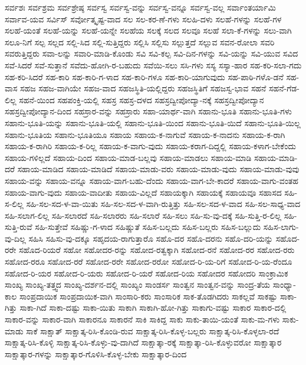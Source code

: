{ಸರ್ವಶಃ
ಸರ್ವಶ್ರಮ
ಸರ್ವಶ್ರೇಷ್ಠ
ಸರ್ವಸ್ವ
ಸರ್ವಸ್ವ-ವನ್ನು
ಸರ್ವಸ್ವ-ವನ್ನೂ
ಸರ್ವಸ್ವ-ವಲ್ಲ
ಸರ್ವಾಂತರ್ಯಾಮಿ
ಸರ್ವಾವ-ಯವ
ಸರ್ವಿಸ್
ಸರ್ವೋತ್ಕೃಷ್ಟ-ವಾದ
ಸಲ
ಸಲ-ಕರ-ಣೆ-ಗಳು
ಸಲಹಿ-ದಳು
ಸಲಹೆ-ಗಳನ್ನು
ಸಲಹೆ-ಗಳ
ಸಲಹೆ-ಯಂತೆ
ಸಲಹೆ-ಯನ್ನು
ಸಲಹೆ-ಯನ್ನೇ
ಸಲಹೆಯ
ಸಲಕ್ಕೆ
ಸಲದ
ಸಲವೂ
ಸಲಹೆ
ಸಲಾ-ಕೆ-ಗಳನ್ನು
ಸಲು-ವಾಗಿ
ಸಲೂ-ನಿಗೆ
ಸಲ್ಪ
ಸಲ್ಲದ
ಸಲ್ಲಿ-ಸಿದ
ಸಲ್ಲಿ-ಸುತ್ತಿದ್ದರು
ಸಲ್ಲಿಸಿ
ಸಲ್ಲಿಸು
ಸಲ್ಲುತ್ತದೆ
ಸಲ್ಲುವ
ಸವನ-ರೋಲಾ
ಸವರಿ
ಸವರುತ್ತಿದ್ದರು
ಸವಾ-ಲನ್ನು
ಸವಾರಿ-ಮಾಡಿ-ಕೊಂಡು
ಸವಿ
ಸವಿ-ಕಲ್ಪ
ಸವಿ-ದಿನ-ಗಳನ್ನು
ಸವಿ-ಯನ್ನು
ಸವಿ-ಯುವ
ಸವಿದ
ಸವೆ-ಸಿದರೆ
ಸವೆ-ಸುತ್ತಾನೆ
ಸವೆದು-ಹೋಗಿ-ರ-ಬಹುದು
ಸವೆಯಿ-ಸಲು
ಸಸಿ-ಗಳು
ಸಸ್ಯ
ಸಸ್ಯಾ-ಹಾರ
ಸಹ-ಕರಿ-ಸಲಾ-ಗದು
ಸಹ-ಕರಿ-ಸಿದರೆ
ಸಹ-ಕಾರಿ
ಸಹ-ಕಾರಿ-ಗ-ಳಾದ
ಸಹ-ಕಾರಿ-ಗಳೂ
ಸಹ-ಕಾರಿ-ಯಾಗುವುದು
ಸಹ-ಪಾಠಿ-ಗಳೊ-ಡನೆ
ಸಹ-ವಾಸ
ಸಹಜ
ಸಹಜ-ವಾಗಿಯೇ
ಸಹಜ-ವಾದ
ಸಹಜಸ್ಥಿತಿ-ಯಲ್ಲಿದ್ದರು
ಸಹಜಸ್ಥಿತಿಗೆ
ಸಹಜಸ್ವ-ಭಾವ
ಸಹನೆ
ಸಹನೆ-ಗೆಡ-ಲಿಲ್ಲ
ಸಹನೆ-ಯಿಂದ
ಸಹಪಂಕ್ತಿ-ಯಲ್ಲಿ
ಸಹಸ್ರ
ಸಹಸ್ರ-ದಳದ
ಸಹಸ್ರದ್ವೀಪೋದ್ಯಾ-ನಕ್ಕೆ
ಸಹಸ್ರದ್ವೀಪೋದ್ಯಾನ
ಸಹಸ್ರದ್ವೀಪೋದ್ಯಾನ-ದಿಂದ
ಸಹಸ್ರಾರ-ವನ್ನು
ಸಹಸ್ರಾರು
ಸಹಾ-ಯಾರ್ಥ-ವಾಗಿ
ಸಹಾನು-ಭೂತಿ
ಸಹಾನು-ಭೂತಿ-ಗಳು
ಸಹಾನು-ಭೂತಿ-ಯನ್ನು
ಸಹಾನು-ಭೂತಿ-ಯಲ್ಲಿ
ಸಹಾನು-ಭೂತಿ-ಯಿಂದ
ಸಹಾನು-ಭೂತಿ-ಯಿದೆ
ಸಹಾನು-ಭೂತಿ-ಯಿಲ್ಲ
ಸಹಾನು-ಭೂತಿಯ
ಸಹಾನು-ಭೂತಿಯೂ
ಸಹಾಯ
ಸಹಾಯ-ಕ-ನಾಗುವೆ
ಸಹಾಯ-ಕ-ನಾದನು
ಸಹಾಯ-ಕ-ರಾಗಿ
ಸಹಾಯ-ಕ-ರಾಗಿರಿ
ಸಹಾಯ-ಕ-ರಿಲ್ಲ
ಸಹಾಯ-ಕ-ವಾಗು-ವುದು
ಸಹಾಯ-ಕರಾಗ-ದಿದ್ದಲ್ಲಿ
ಸಹಾಯ-ಕಳಾಗ-ಬೇಕೆಂದು
ಸಹಾಯ-ಗಳಿಲ್ಲದೆ
ಸಹಾಯ-ದಿಂದ
ಸಹಾಯ-ಮಾಡ-ಬಲ್ಲವು
ಸಹಾಯ-ಮಾಡಲು
ಸಹಾಯ-ಮಾಡಿ
ಸಹಾಯ-ಮಾಡಿ-ದರೆ
ಸಹಾಯ-ಮಾಡಿದ
ಸಹಾಯ-ಮಾಡಿದೆ
ಸಹಾಯ-ಮಾಡು-ವರು
ಸಹಾಯ-ಮಾಡು-ವುದು
ಸಹಾಯ-ಮಾಡು-ವುವು
ಸಹಾಯ-ವನ್ನು
ಸಹಾಯ-ವನ್ನೂ
ಸಹಾಯ-ವಾಗ-ಬಹು-ದೆಂದು
ಸಹಾಯ-ವಾಗ-ಬೇ-ಕಾದರೆ
ಸಹಾಯ-ವಾಗು-ವಂತಹ
ಸಹಾಯ-ವಾಗು-ವುದು
ಸಹಾಯ-ವಾದೀತು
ಸಹಾಯ-ವಿಲ್ಲದೆ
ಸಹಾಯಕ್ಕಾಗಿ
ಸಹಾಯಕ್ಕೆ
ಸಹಾಯವೂ
ಸಹಾಸದ
ಸಹಿ-ಸ-ಲಿಲ್ಲ
ಸಹಿ-ಸಲ-ಸದ-ಳ-ವಾ-ಯಿತು
ಸಹಿ-ಸಲ-ಸದ-ಳ-ವಾಗಿ-ರುತ್ತಿತ್ತು
ಸಹಿ-ಸಲ-ಸದ-ಳ-ವಾದ
ಸಹಿ-ಸಲ-ಸಾಧ್ಯ-ವಾದ
ಸಹಿ-ಸಲಾಗ-ಲಿಲ್ಲ
ಸಹಿ-ಸಲಾರದೆ
ಸಹಿ-ಸಲಾರರು
ಸಹಿ-ಸಲಾರೆ
ಸಹಿ-ಸಲು
ಸಹಿ-ಸು-ವು-ದಕ್ಕೆ
ಸಹಿ-ಸುತ್ತಿ-ರ-ಲಿಲ್ಲ
ಸಹಿ-ಸುತ್ತಿ-ರುವೆ
ಸಹಿ-ಸುತ್ತೇವೆ
ಸಹಿಷ್ಣು-ಗ-ಳಾದ
ಸಹಿಷ್ಣುತೆ
ಸಹಿಸ-ಬಲ್ಲದು
ಸಹಿಸ-ಬಲ್ಲರು
ಸಹಿಸ-ಬಲ್ಲುದು
ಸಹಿಸ-ಲಾಗು-ವು-ದಿಲ್ಲ
ಸಹಿಸಿ
ಸಹಿಸು-ವು-ದಕ್ಕೂ
ಸಹೃದಯ-ರಾಗುತ್ತಾರೊ
ಸಹೊ-ದರ
ಸಹೊ-ದರನು
ಸಹೊ-ದರಿ-ಯನ್ನು
ಸಹೊದ-ರರೇ
ಸಹೊದ-ರಿಯರೆ
ಸಹೋ
ಸಹೋದರ-ರನ್ನು
ಸಹೋದ-ರತ್ವಕ್ಕಾಗಿ
ಸಹೋದ-ರನೆ
ಸಹೋದ-ರರ
ಸಹೋದ-ರರು
ಸಹೋದ-ರರೂ
ಸಹೋದ-ರರೆ
ಸಹೋದ-ರರೇ
ಸಹೋದ-ರರೋ
ಸಹೋದ-ರಿ-ಯ-ರಿಗೆ
ಸಹೋದ-ರಿ-ಯ-ರೆಂದೂ
ಸಹೋದ-ರಿ-ಯರ
ಸಹೋದ-ರಿ-ಯರು
ಸಹೋದ-ರಿ-ಯರೆ
ಸಹೋದ-ರಿಯ
ಸಹೋದರ
ಸಹೋದರಿ
ಸಾಂಕ್ರಾಮಿಕ
ಸಾಂಖ್ಯ
ಸಾಂಖ್ಯ-ತತ್ತ್ವದ
ಸಾಂಖ್ಯ-ದರ್ಶನ-ದಲ್ಲಿ
ಸಾಂಖ್ಯಂ
ಸಾಂಡರ್ಸ
ಸಾಂತ್ವನ
ಸಾಂತ್ವನ-ವನ್ನು
ಸಾಂದ್ರ-ತೆಯ
ಸಾಂಧ್ಯಾ-ಕಾಲ
ಸಾಂಪ್ರದಾಯಿಕ
ಸಾಂಪ್ರದಾಯಿಕ-ವಾಗಿ
ಸಾಂಸಾರಿ-ಕರು
ಸಾಂಸಾರಿಕ
ಸಾಕ-ತೊಡಗಿದರು
ಸಾಕಲ್ಲವೆ
ಸಾಕಷ್ಟು
ಸಾಕಾ-ಗಿತ್ತು
ಸಾಕಾ-ಗಿದೆ
ಸಾಕಾ-ದಷ್ಟು
ಸಾಕಾ-ಯಿತು
ಸಾಕಾಗಿ
ಸಾಕಾಗಿ-ಹೋ-ಗಿತ್ತು
ಸಾಕಾಗು-ವಷ್ಟು
ಸಾಕಾರ
ಸಾಕಾರ-ದಲ್ಲಿ
ಸಾಕಾರ-ವನ್ನು
ಸಾಕಾರ-ವಾಗಿ
ಸಾಕಾರನೂ
ಸಾಕಾರನೆ
ಸಾಕಿ
ಸಾಕಿದ್ದ
ಸಾಕು
ಸಾಕು-ತಾಯಿ-ಯಂತೆ
ಸಾಕು-ಮ-ಗಳು
ಸಾಕು-ಮಾಡು
ಸಾಕೆ
ಸಾಕ್ಷಾತ್
ಸಾಕ್ಷಾತ್ಕ-ರಿಸಿ-ಕೊಂಡಿ-ರುವ
ಸಾಕ್ಷಾತ್ಕ-ರಿಸಿ-ಕೊಳ್ಳ-ಬಲ್ಲರು
ಸಾಕ್ಷಾತ್ಕ-ರಿಸಿ-ಕೊಳ್ಳಲಾ-ರದೆ
ಸಾಕ್ಷಾತ್ಕ-ರಿಸಿ-ಕೊಳ್ಳಿ
ಸಾಕ್ಷಾತ್ಕ-ರಿಸಿ-ಕೊಳ್ಳು-ವು-ದಾಗಿದೆ
ಸಾಕ್ಷಾತ್ಕಾ-ರಕ್ಕೆ
ಸಾಕ್ಷಾತ್ಕಾ-ರಿಸಿ-ಕೊಳ್ಳುವರೋ
ಸಾಕ್ಷಾತ್ಕಾರ
ಸಾಕ್ಷಾತ್ಕಾರ-ಗಳನ್ನು
ಸಾಕ್ಷಾತ್ಕಾರ-ಗೊಳಿಸಿ-ಕೊಳ್ಳ-ಬೇಕು
ಸಾಕ್ಷಾತ್ಕಾರ-ದಿಂದ
}
